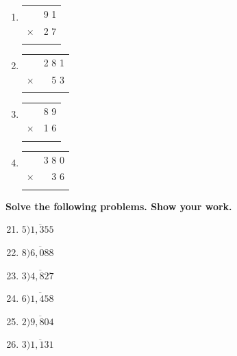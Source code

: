 \documentclass[11pt, a4paper]{article}
\begin{document}
\begin{enumerate}[label=\arabic*.]
    \vspace{1.5cm}
    \setcounter{enumi}{13}
    \item \begin{tabular}{c r}
          & 9 1 \\
        $\times$ & 2 7 \\ \hline
          & \\ \hline
    \end{tabular}
    \hfill
    \setcounter{enumi}{18}
    \item \begin{tabular}{c r}
          & 2 8 1 \\
        $\times$ & 5 3 \\ \hline
          & \\ \hline
    \end{tabular}

    \vspace{1.5cm}
    \setcounter{enumi}{14}
    \item \begin{tabular}{c r}
          & 8 9 \\
        $\times$ & 1 6 \\ \hline
          & \\ \hline
    \end{tabular}
    \hfill
    \setcounter{enumi}{19}
    \item \begin{tabular}{c r}
          & 3 8 0 \\
        $\times$ & 3 6 \\ \hline
          & \\ \hline
    \end{tabular}
\end{enumerate}

\pagebreak

\textbf{Solve the following problems. Show your work.}

\begin{enumerate}[label=\arabic*.]
    \setcounter{enumi}{20}
    \item $5 \overline{) 1, 3 5 5}$
    \hfill
    \setcounter{enumi}{23}
    \item $8 \overline{) 6, 0 8 8}$

    \vspace{2cm}
    \setcounter{enumi}{21}
    \item $3 \overline{) 4, 8 2 7}$
    \hfill
    \setcounter{enumi}{24}
    \item $6 \overline{) 1, 4 5 8}$

    \vspace{2cm}
    \setcounter{enumi}{22}
    \item $2 \overline{) 9, 8 0 4}$
    \hfill
    \setcounter{enumi}{25}
    \item $3 \overline{) 1, 1 3 1}$
\end{enumerate}
\end{document}
